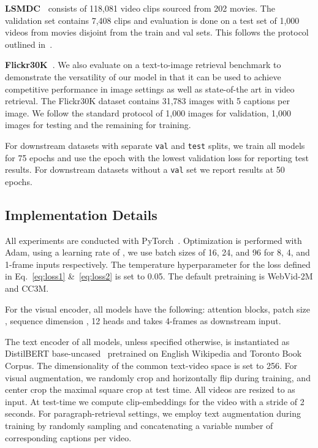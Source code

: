 \noindent\textbf{LSMDC~\cite{Rohrbach_2015_CVPR}} consists of 118,081 video clips sourced from 202 movies. The validation set contains 7,408 clips and evaluation is done on a test set of 1,000 videos from movies disjoint from the train and val sets. This follows the protocol outlined in~\cite{rohrbach2017movie}.

\noindent\textbf{Flickr30K~\cite{young-etal-2014-image}}. We also evaluate on a text-to-image retrieval benchmark to demonstrate the versatility of our model in that it can be used to achieve competitive performance in image settings as well as state-of-the art in video retrieval. The Flickr30K dataset contains 31,783 images with 5 captions per image. We follow the standard protocol of 1,000 images for validation, 1,000 images for testing and the remaining for training.

For downstream datasets with separate \texttt{val} and \texttt{test} splits, we train all models for 75 epochs and use the epoch with the lowest validation loss for reporting test results. For downstream datasets without a \texttt{val} set we report results at 50 epochs.

\subsection{Implementation Details}
\label{subsec:implementation}
All experiments are conducted with PyTorch~\cite{NEURIPS2019_9015}. Optimization is performed with Adam, using a learning rate of , we use batch sizes of 16, 24, and 96 for 8, 4, and 1-frame inputs respectively. The temperature hyperparameter  for the loss defined in Eq.~\ref{eq:loss1} \&~\ref{eq:loss2} is set to 0.05. The default pretraining is WebVid-2M and CC3M.

For the visual encoder, all models have the following:  attention blocks, patch size , sequence dimension , 12 heads and takes 4-frames as downstream input.

The text encoder of all models, unless specified otherwise, is instantiated as DistilBERT base-uncased~\cite{distilbert} pretrained on English Wikipedia and Toronto Book Corpus. The dimensionality of the common text-video space is set to 256. For visual augmentation, we randomly crop and horizontally flip during training, and center crop the maximal square crop at test time. All videos are resized to  as input. At test-time we compute clip-embeddings for the video with a stride of 2 seconds.
For paragraph-retrieval settings, we employ text augmentation during training by randomly sampling and concatenating a variable number of corresponding captions per video.

